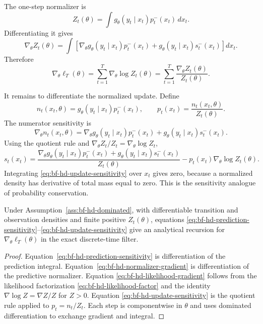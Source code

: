 The one-step normalizer is
\begin{equation}
  Z_t(\theta)=\int g_\theta(y_t\mid x_t)p_t^-(x_t)\,dx_t .
  \label{eq:bf-hd-gradient-normalizer}
\end{equation}
Differentiating it gives
\begin{equation}
  \nabla_\theta Z_t(\theta)
  =
  \int
  \left[
  \nabla_\theta g_\theta(y_t\mid x_t)p^-_t(x_t)
  +
  g_\theta(y_t\mid x_t)s^-_t(x_t)
  \right]dx_t .
  \label{eq:bf-hd-normalizer-gradient}
\end{equation}
Therefore
\begin{equation}
  \nabla_\theta \ell_T(\theta)
  =
  \sum_{t=1}^T
  \nabla_\theta \log Z_t(\theta)
  =
  \sum_{t=1}^T
  \frac{\nabla_\theta Z_t(\theta)}{Z_t(\theta)} .
  \label{eq:bf-hd-likelihood-gradient}
\end{equation}

It remains to differentiate the normalized update.  Define
\[
  n_t(x_t,\theta)=g_\theta(y_t\mid x_t)p_t^-(x_t),
  \qquad
  p_t(x_t)=\frac{n_t(x_t,\theta)}{Z_t(\theta)}.
\]
The numerator sensitivity is
\[
  \nabla_\theta n_t(x_t,\theta)
  =
  \nabla_\theta g_\theta(y_t\mid x_t)p_t^-(x_t)
  +
  g_\theta(y_t\mid x_t)s_t^-(x_t).
\]
Using the quotient rule and
\(\nabla_\theta Z_t/Z_t=\nabla_\theta\log Z_t\),
\begin{equation}
  s_t(x_t)
  =
  \frac{
  \nabla_\theta g_\theta(y_t\mid x_t)p^-_t(x_t)
  +
  g_\theta(y_t\mid x_t)s^-_t(x_t)
  }{Z_t(\theta)}
  -
  p_t(x_t)\nabla_\theta\log Z_t(\theta).
  \label{eq:bf-hd-update-sensitivity}
\end{equation}
Integrating \eqref{eq:bf-hd-update-sensitivity} over \(x_t\) gives zero,
because a normalized density has derivative of total mass equal to zero.  This
is the sensitivity analogue of probability conservation.

\begin{proposition}
\label{prop:bf-hd-likelihood-sensitivity}
Under Assumption~\ref{ass:bf-hd-dominated}, with differentiable transition and
observation densities and finite positive \(Z_t(\theta)\), equations
\eqref{eq:bf-hd-prediction-sensitivity}--\eqref{eq:bf-hd-update-sensitivity}
give an analytical recursion for \(\nabla_\theta\ell_T(\theta)\) in the exact
discrete-time filter.
\end{proposition}

\begin{proof}
Equation~\eqref{eq:bf-hd-prediction-sensitivity} is differentiation of the
prediction integral.  Equation~\eqref{eq:bf-hd-normalizer-gradient} is
differentiation of the predictive normalizer.  Equation
\eqref{eq:bf-hd-likelihood-gradient} follows from the likelihood factorization
\eqref{eq:bf-hd-likelihood-factor} and the identity
\(\nabla\log Z=\nabla Z/Z\) for \(Z>0\).  Equation
\eqref{eq:bf-hd-update-sensitivity} is the quotient rule applied to
\(p_t=n_t/Z_t\).  Each step is componentwise in \(\theta\) and uses dominated
differentiation to exchange gradient and integral.
\end{proof}

